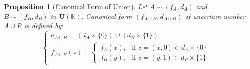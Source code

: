 \documentclass[a4paper,12pt, twoside]{memoir}
\newtheorem{proposition}{Proposition}[chapter]
\begin{document}
\begin{proposition}[Canonical Form of Union]
	Let $A \sim (f_A, d_A)$ and $B \sim (f_B, d_B)$ in $\mathbf{U}(\mathbb{K})$. Canonical form $(f_{A \cup B}, d_{A \cup B})$ of uncertain number $A \cup B$ is defined by:
	\[
		\begin{cases}
			d_{A \cup B} = (d_A \times \{0\}) \cup (d_B \times \{1\}) \\[1ex]
			f_{A \cup B}(z) = \begin{cases}
				                  f_A(x), & \text{if } z = (x, 0) \in d_A \times \{0\} \\[1ex]
				                  f_B(y), & \text{if } z = (y, 1) \in d_B \times \{1\}
			                  \end{cases}
		\end{cases}
	\]
\end{proposition}
\end{document}
